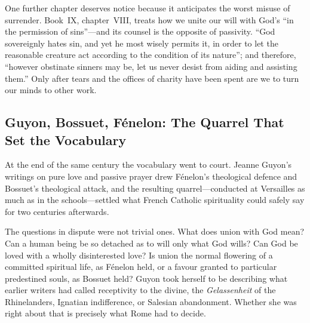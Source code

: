 One further chapter deserves notice because it anticipates the worst misuse of surrender. Book~IX, chapter~VIII, treats how we unite our will with God's ``in the permission of sins''---and its counsel is the opposite of passivity. ``God sovereignly hates sin, and yet he most wisely permits it, in order to let the reasonable creature act according to the condition of its nature''; and therefore, ``however obstinate sinners may be, let us never desist from aiding and assisting them.'' Only after tears and the offices of charity have been spent are we to turn our minds to other work.

\subsection{Guyon, Bossuet, Fénelon: The Quarrel That Set the Vocabulary}

At the end of the same century the vocabulary went to court. Jeanne Guyon's writings on pure love and passive prayer drew Fénelon's theological defence and Bossuet's theological attack, and the resulting quarrel---conducted at Versailles as much as in the schools---settled what French Catholic spirituality could safely say for two centuries afterwards.

The questions in dispute were not trivial ones. What does union with God mean? Can a human being be so detached as to will only what God wills? Can God be loved with a wholly disinterested love? Is union the normal flowering of a committed spiritual life, as Fénelon held, or a favour granted to particular predestined souls, as Bossuet held? Guyon took herself to be describing what earlier writers had called receptivity to the divine, the \emph{Gelassenheit} of the Rhinelanders, Ignatian indifference, or Salesian abandonment. Whether she was right about that is precisely what Rome had to decide.

